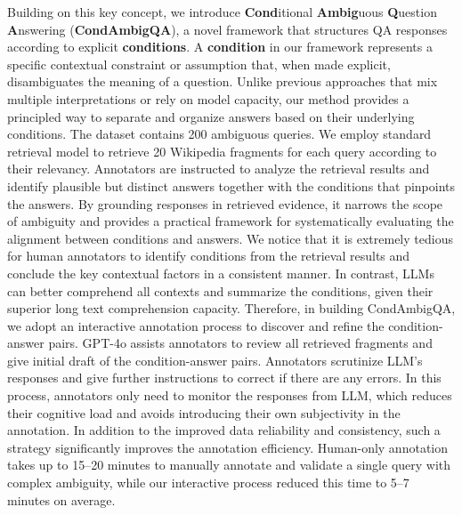 Building on this key concept, we introduce \textbf{Cond}itional \textbf{Ambig}uous \textbf{Q}uestion \textbf{A}nswering (\textbf{CondAmbigQA}), a novel framework that structures QA responses according to explicit \textbf{conditions}. A \textbf{condition} in our framework represents a specific contextual constraint or assumption that, when made explicit, disambiguates the meaning of a question. Unlike previous approaches \cite{stelmakh-etal-2022-asqa} that mix multiple interpretations or rely on model capacity, our method provides a principled way to separate and organize answers based on their underlying conditions. %
The dataset contains 200 ambiguous queries. We employ standard retrieval model to retrieve 20 Wikipedia fragments for each query according to their relevancy. Annotators are instructed to analyze the retrieval results and identify plausible but distinct answers together with the conditions that pinpoints the answers. By grounding responses in retrieved evidence, it narrows the scope of ambiguity and provides a practical framework for systematically evaluating the alignment between conditions and answers. 
We notice that it is extremely tedious for human annotators to identify conditions from the retrieval results and conclude the key contextual factors in a consistent manner. In contrast, LLMs can better comprehend all contexts and summarize the conditions, given their superior long text comprehension capacity. Therefore, in building CondAmbigQA, we adopt an interactive annotation process to discover and refine the condition-answer pairs. GPT-4o assists annotators to review all retrieved fragments and give initial draft of the condition-answer pairs. Annotators scrutinize LLM's responses and give further instructions to correct if there are any errors. In this process, annotators only need to monitor the responses from LLM, which reduces their cognitive load and avoids introducing their own subjectivity in the annotation. In addition to the improved data reliability and consistency, such a strategy significantly improves the annotation efficiency. Human-only annotation takes up to 15–20 minutes to manually annotate and validate a single query with complex ambiguity, while our interactive process reduced this time to 5–7 minutes on average.


